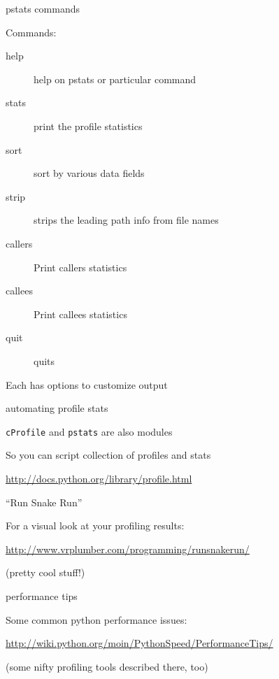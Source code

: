 \documentclass{beamer}
\begin{document}
\begin{frame}[fragile]{pstats commands}

{\Large Commands:}

\begin{description}
  \item[help] help on pstats or particular command
  \item[stats] print the profile statistics
  \item[sort] sort by various data fields
  \item[strip] strips the leading path info from file names
  \item[callers] Print callers statistics
  \item[callees] Print callees statistics
  \item[quit] quits
\end{description}
{\large Each has options to customize output}

\end{frame} 

\begin{frame}[fragile]{automating profile stats}

{\Large \verb|cProfile| and \verb|pstats| are also modules}

\vfill
{\Large So you can script collection of profiles and stats}

\vfill
\url{http://docs.python.org/library/profile.html}

\end{frame} 

\begin{frame}[fragile]{``Run Snake Run''}

\vfill
{\Large For a visual look at your profiling results:}

\vfill
\url{http://www.vrplumber.com/programming/runsnakerun/}

\vfill
(pretty cool stuff!)

\end{frame} 


\begin{frame}[fragile]{performance tips}

\vfill
{\Large Some common python performance issues:}

\vfill
\url{http://wiki.python.org/moin/PythonSpeed/PerformanceTips/}

\vfill
(some nifty profiling tools described there, too)

\end{frame} 
\end{document}
